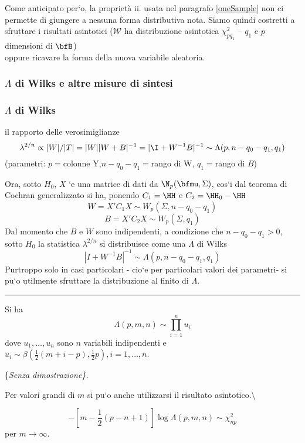 \documentclass[]{article}
\begin{document}
Come anticipato per`o, la proprietà ii. usata nel paragrafo
\ref{oneSample} non ci permette di giungere a nessuna forma distributiva
nota. Siamo quindi costretti a sfruttare i risultati asintotici
(\(\mathcal{W}\) ha distribuzione asintotica \(\chi^2_{pq_1}\) --
\(q_1\) e \(p\) dimensioni di \(\bfB\))\\
oppure ricavare la forma della nuova variabile aleatoria.

\subsubsection{$\Lambda$ di Wilks e altre misure di sintesi}
\subsubsection*{$\Lambda$ di Wilks}

il rapporto delle verosimiglianze
\[\lambda^{2/n} \propto |W| /|T| =  |W| |W+B|^{-1} =  |\I +W^{-1}B|^{-1} \sim \Lambda(p,n-q_0-q_1,q_1) \]
(parametri: \(p=\)colonne Y,\(n-q_0-q_1=\)rango di W, \(q_1=\)rango di
\(B\))

Ora, sotto \(H_0\), \(X\) `e una matrice di dati da
\(\N_p(\bfmu,\Sigma)\), cos`i dal teorema di Cochran generalizzato si
ha, ponendo \(C_1=\HH\) e \(C_2=\HH_0-\HH\) \[
W=X'C_1X \sim W_p(\Sigma,n-q_0-q_1)
\] \[
B=X'C_2X \sim W_p(\Sigma,q_1)
\] Dal momento che \(B\) e \(W\) sono indipendenti, a condizione che
\(n-q_0-q_1> 0\), sotto \(H_0\) la statistica \(\lambda^{2/n}\) si
distribuisce come una \(\Lambda\) di Wilks \[
|I+W^{-1}B|^{-1} \sim \Lambda(p,n-q_0-q_1,q_1)
\] Purtroppo solo in casi particolari - cio`e per particolari valori dei
parametri- si pu`o utilmente sfruttare la distribuzione al finito di
\(\Lambda\).

\begin{center}\rule{0.5\linewidth}{\linethickness}\end{center}

\begin{theorem}
Si ha
$$
\Lambda(p,m,n) \sim \prod_{i=1}^nu_i
$$
dove $u_1,\ldots,u_n$ sono $n$ variabili indipendenti e $u_i \sim \beta(\frac{1}{2}
(m+i-p), \frac{1}{2}p), i=1,\ldots,n$.
\end{theorem}

\{\em Senza dimostrazione\}.

Per valori grandi di \(m\) si pu`o anche utilizzarsi il risultato
asintotico.\textbackslash{}

\begin{theorem} 
$$
-[m-\frac{1}{2}(p-n+1)]\log\Lambda(p,m,n) \sim \chi^2_{np}
$$
per $m \rightarrow \infty$.
\end{theorem}
\end{document}

